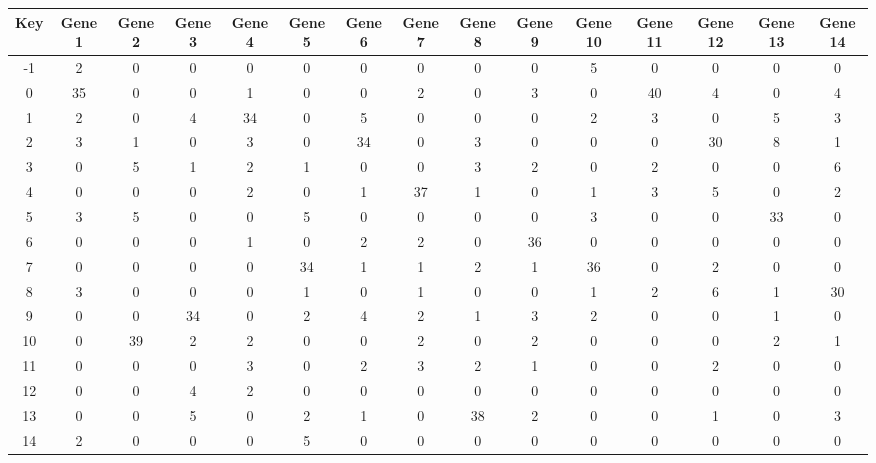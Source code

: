 \begin{tabular}{|c|c|c|c|c|c|c|c|c|c|c|c|c|c|c|}
\hline
Key & Gene 1 & Gene 2 & Gene 3 & Gene 4 & Gene 5 & Gene 6 & Gene 7 & Gene 8 & Gene 9 & Gene 10 & Gene 11 & Gene 12 & Gene 13 & Gene 14 \\
\hline
-1 & 2 & 0 & 0 & 0 & 0 & 0 & 0 & 0 & 0 & 5 & 0 & 0 & 0 & 0 \\
0 & 35 & 0 & 0 & 1 & 0 & 0 & 2 & 0 & 3 & 0 & 40 & 4 & 0 & 4 \\
1 & 2 & 0 & 4 & 34 & 0 & 5 & 0 & 0 & 0 & 2 & 3 & 0 & 5 & 3 \\
2 & 3 & 1 & 0 & 3 & 0 & 34 & 0 & 3 & 0 & 0 & 0 & 30 & 8 & 1 \\
3 & 0 & 5 & 1 & 2 & 1 & 0 & 0 & 3 & 2 & 0 & 2 & 0 & 0 & 6 \\
4 & 0 & 0 & 0 & 2 & 0 & 1 & 37 & 1 & 0 & 1 & 3 & 5 & 0 & 2 \\
5 & 3 & 5 & 0 & 0 & 5 & 0 & 0 & 0 & 0 & 3 & 0 & 0 & 33 & 0 \\
6 & 0 & 0 & 0 & 1 & 0 & 2 & 2 & 0 & 36 & 0 & 0 & 0 & 0 & 0 \\
7 & 0 & 0 & 0 & 0 & 34 & 1 & 1 & 2 & 1 & 36 & 0 & 2 & 0 & 0 \\
8 & 3 & 0 & 0 & 0 & 1 & 0 & 1 & 0 & 0 & 1 & 2 & 6 & 1 & 30 \\
9 & 0 & 0 & 34 & 0 & 2 & 4 & 2 & 1 & 3 & 2 & 0 & 0 & 1 & 0 \\
10 & 0 & 39 & 2 & 2 & 0 & 0 & 2 & 0 & 2 & 0 & 0 & 0 & 2 & 1 \\
11 & 0 & 0 & 0 & 3 & 0 & 2 & 3 & 2 & 1 & 0 & 0 & 2 & 0 & 0 \\
12 & 0 & 0 & 4 & 2 & 0 & 0 & 0 & 0 & 0 & 0 & 0 & 0 & 0 & 0 \\
13 & 0 & 0 & 5 & 0 & 2 & 1 & 0 & 38 & 2 & 0 & 0 & 1 & 0 & 3 \\
14 & 2 & 0 & 0 & 0 & 5 & 0 & 0 & 0 & 0 & 0 & 0 & 0 & 0 & 0 \\
\hline
\end{tabular}